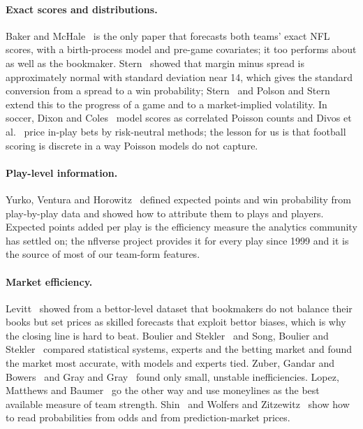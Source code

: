 \documentclass[11pt]{article}
\begin{document}
\paragraph{Exact scores and distributions.} Baker and McHale~\cite{bakermchale2013} is the only paper that forecasts both teams' exact NFL scores, with a birth-process model and pre-game covariates; it too performs about as well as the bookmaker. Stern~\cite{stern1991} showed that margin minus spread is approximately normal with standard deviation near 14, which gives the standard conversion from a spread to a win probability; Stern~\cite{stern1994} and Polson and Stern~\cite{polsonstern2015} extend this to the progress of a game and to a market-implied volatility. In soccer, Dixon and Coles~\cite{dixoncoles1997} model scores as correlated Poisson counts and Divos et al.~\cite{divos2018} price in-play bets by risk-neutral methods; the lesson for us is that football scoring is discrete in a way Poisson models do not capture.

\paragraph{Play-level information.} Yurko, Ventura and Horowitz~\cite{yurko2019} defined expected points and win probability from play-by-play data and showed how to attribute them to plays and players. Expected points added per play is the efficiency measure the analytics community has settled on; the nflverse project provides it for every play since 1999 and it is the source of most of our team-form features.

\paragraph{Market efficiency.} Levitt~\cite{levitt2004} showed from a bettor-level dataset that bookmakers do not balance their books but set prices as skilled forecasts that exploit bettor biases, which is why the closing line is hard to beat. Boulier and Stekler~\cite{boulierstekler2003} and Song, Boulier and Stekler~\cite{songboulierstekler2007} compared statistical systems, experts and the betting market and found the market most accurate, with models and experts tied. Zuber, Gandar and Bowers~\cite{zuber1985} and Gray and Gray~\cite{graygray1997} found only small, unstable inefficiencies. Lopez, Matthews and Baumer~\cite{lopez2018} go the other way and use moneylines as the best available measure of team strength. Shin~\cite{shin1993} and Wolfers and Zitzewitz~\cite{wolferszitzewitz2006} show how to read probabilities from odds and from prediction-market prices.
\end{document}
